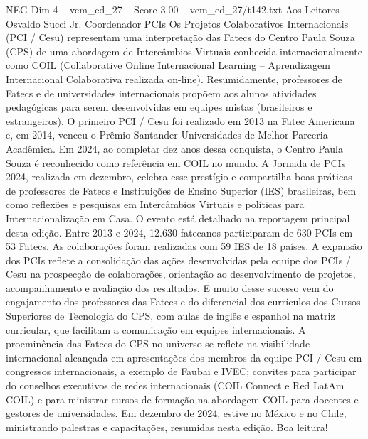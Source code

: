 \begin{textsample}{NEG Dim 4 – vem\_ed\_27 – Score 3.00 – vem\_ed\_27/t142.txt}  \label{ex:f4_neg_149}
Aos Leitores Osvaldo Succi Jr.
Coordenador PCIs Os Projetos Colaborativos Internacionais (PCI / Cesu) representam uma interpretação das Fatecs do Centro Paula Souza (CPS) de uma abordagem de Intercâmbios Virtuais conhecida internacionalmente como COIL (Collaborative Online Internacional Learning – Aprendizagem Internacional Colaborativa realizada on-line).
Resumidamente, professores de Fatecs e de universidades internacionais propõem aos alunos atividades pedagógicas para serem desenvolvidas em equipes mistas (brasileiros e estrangeiros).
O primeiro PCI / Cesu foi realizado em 2013 na Fatec Americana e, em 2014, venceu o Prêmio Santander Universidades de Melhor Parceria Acadêmica.
Em 2024, ao completar dez anos dessa conquista, o Centro Paula Souza é reconhecido como referência em COIL no mundo.
A Jornada de PCIs 2024, realizada em dezembro, celebra esse prestígio e compartilha boas práticas de professores de Fatecs e Instituições de Ensino Superior (IES) brasileiras, bem como reflexões e pesquisas em Intercâmbios Virtuais e políticas para Internacionalização em Casa.
O evento está detalhado na reportagem principal desta edição.
Entre 2013 e 2024, 12.630 fatecanos participaram de 630 PCIs em 53 Fatecs.
As colaborações foram realizadas com 59 IES de 18 países.
A expansão dos PCIs reflete a consolidação das ações desenvolvidas pela equipe dos PCIs / Cesu na prospecção de colaborações, orientação ao desenvolvimento de projetos, acompanhamento e avaliação dos resultados.
E muito desse sucesso vem do engajamento dos professores das Fatecs e do diferencial dos currículos dos Cursos Superiores de Tecnologia do CPS, com aulas de inglês e espanhol na matriz curricular, que facilitam a comunicação em equipes internacionais.
A proeminência das Fatecs do CPS no universo se reflete na visibilidade internacional alcançada em apresentações dos membros da equipe PCI / Cesu em congressos internacionais, a exemplo de Faubai e IVEC; convites para participar do conselhos executivos de redes internacionais (COIL Connect e Red LatAm COIL) e para ministrar cursos de formação na abordagem COIL para docentes e gestores de universidades.
Em dezembro de 2024, estive no México e no Chile, ministrando palestras e capacitações, resumidas nesta edição.
Boa leitura!

\end{textsample}
